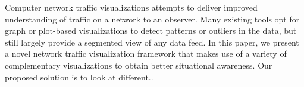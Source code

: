 Computer network traffic visualizations attempts to deliver improved understanding of traffic on a network to an observer. 
Many existing tools opt for graph or plot-based visualizations to detect patterns or outliers in the data, but still largely
provide a segmented view of any data feed. In this paper, we present a novel network traffic visualization framework that 
makes use of a variety of complementary visualizations to obtain better situational awareness. 
Our proposed solution is to look at different..